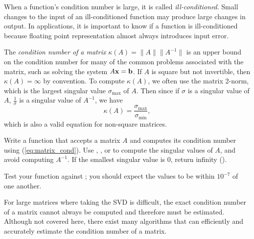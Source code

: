 When a function's condition number is large, it is called \emph{ill-conditioned}.
Small changes to the input of an ill-conditioned function may produce large changes in output.
In applications, it is important to know if a function is ill-conditioned because floating point representation almost always introduces input error.

The \emph{condition number of a matrix} $\kappa (A)=\|A\| \|A^{-1}\|$ is an upper bound on the condition number for many of the common problems associated with the matrix, such as solving the system $A\mathbf{x} =\mathbf{b}$.
If $A$ is square but not invertible, then $\kappa(A) = \infty$ by convention.
To compute $\kappa(A)$, we often use the matrix 2-norm, which is the largest singular value $\sigma_{\max}$ of $A$.
Then since if $\sigma$ is a singular value of $A$, $\frac{1}{\sigma}$ is a singular value of $A^{-1}$, we have
\begin{equation}\label{eq:matrix_cond}
\kappa(A) = \frac{\sigma_{\max}}{\sigma_{\min}},
\end{equation}
which is also a valid equation for non-square matrices.

\begin{problem}\label{matrix-cond} %
Write a function that accepts a matrix $A$ and computes its condition number using (\ref{eq:matrix_cond}).
Use , , or  to compute the singular values of $A$, and avoid computing $A^{-1}$.
If the smallest singular value is 0, return infinity ().

Test your function against ; you should expect the values to be within $10^{-7}$ of one another.
\end{problem}

For large matrices where taking the SVD is difficult, the exact condition number of a matrix cannot always be computed and therefore must be estimated.
Although not covered here, there exist many algorithms that can efficiently and accurately estimate the condition number of a matrix.


